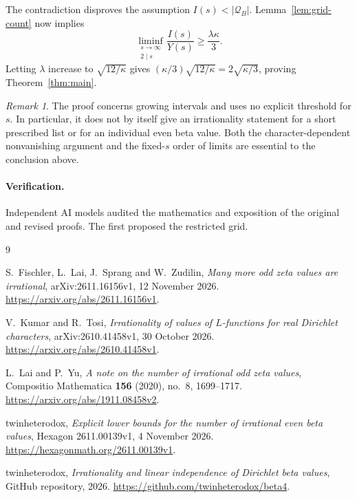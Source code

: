 \documentclass[11pt]{article}
\theoremstyle{remark}
\newtheorem{remark}[theorem]{Remark}
\numberwithin{equation}{section}
\begin{document}
The contradiction disproves the assumption $I(s)<|\mathcal Q_B|$.
Lemma~\ref{lem:grid-count} now implies
\[
 \liminf_{\substack{s\to\infty\\2\mid s}}\frac{I(s)}{Y(s)}
 \geq\frac{\lambda\kappa}{3}.
\]
Letting $\lambda$ increase to $\sqrt{12/\kappa}$ gives
$(\kappa/3)\sqrt{12/\kappa}=2\sqrt{\kappa/3}$, proving Theorem~\ref{thm:main}.

\begin{remark}
The proof concerns growing intervals and uses no explicit threshold for
$s$. In particular, it does not by itself give an irrationality statement
for a short prescribed list or for an individual even beta value. Both
the character-dependent nonvanishing argument and the fixed-$s$ order of
limits are essential to the conclusion above.
\end{remark}

\paragraph{Verification.}
Independent AI models audited the mathematics and exposition of the original and
revised proofs. The first proposed the restricted grid.

\begin{thebibliography}{9}

S.~Fischler, L.~Lai, J.~Sprang and W.~Zudilin,
\emph{Many more odd zeta values are irrational},
arXiv:2611.16156v1, 12 November 2026.
\url{https://arxiv.org/abs/2611.16156v1}.

V.~Kumar and R.~Tosi,
\emph{Irrationality of values of $L$-functions for real Dirichlet characters},
arXiv:2610.41458v1, 30 October 2026.
\url{https://arxiv.org/abs/2610.41458v1}.

L.~Lai and P.~Yu,
\emph{A note on the number of irrational odd zeta values},
Compositio Mathematica \textbf{156} (2020), no.~8, 1699--1717.
\url{https://arxiv.org/abs/1911.08458v2}.

twinheterodox,
\emph{Explicit lower bounds for the number of irrational even beta values},
Hexagon 2611.00139v1, 4 November 2026.
\url{https://hexagonmath.org/2611.00139v1}.

twinheterodox, \emph{Irrationality and linear independence of Dirichlet beta values},
GitHub repository, 2026. \url{https://github.com/twinheterodox/beta4}.

\end{thebibliography}
\end{document}
